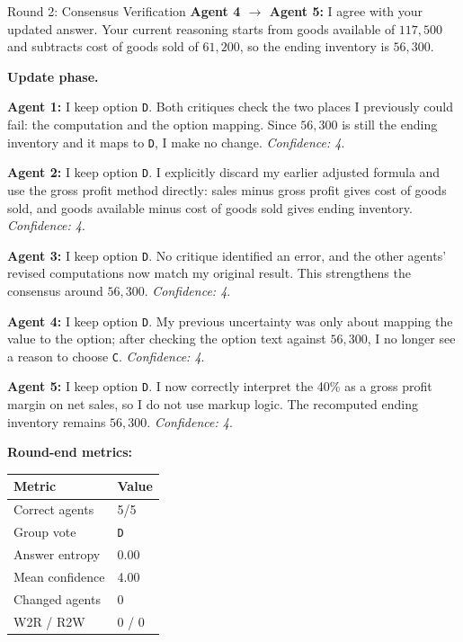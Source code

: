 \begin{roundbox}{Round 2: Consensus Verification}
\textbf{Agent 4 $\rightarrow$ Agent 5:} I agree with your updated answer. Your current reasoning starts from goods available of $117{,}500$ and subtracts cost of goods sold of $61{,}200$, so the ending inventory is $56{,}300$.

\textbf{Update phase.}

\textbf{Agent 1:} I keep option \texttt{D}. Both critiques check the two places I previously could fail: the computation and the option mapping. Since $56{,}300$ is still the ending inventory and it maps to \texttt{D}, I make no change. \textit{Confidence: 4}.

\textbf{Agent 2:} I keep option \texttt{D}. I explicitly discard my earlier adjusted formula and use the gross profit method directly: sales minus gross profit gives cost of goods sold, and goods available minus cost of goods sold gives ending inventory. \textit{Confidence: 4}.

\textbf{Agent 3:} I keep option \texttt{D}. No critique identified an error, and the other agents' revised computations now match my original result. This strengthens the consensus around $56{,}300$. \textit{Confidence: 4}.

\textbf{Agent 4:} I keep option \texttt{D}. My previous uncertainty was only about mapping the value to the option; after checking the option text against $56{,}300$, I no longer see a reason to choose \texttt{C}. \textit{Confidence: 4}.

\textbf{Agent 5:} I keep option \texttt{D}. I now correctly interpret the 40\% as a gross profit margin on net sales, so I do not use markup logic. The recomputed ending inventory remains $56{,}300$. \textit{Confidence: 4}.

\vspace{1mm}
\textbf{Round-end metrics:}
\begin{center}
\footnotesize
\begin{tabular}{@{}ll@{}}
\toprule
Metric & Value \\
\midrule
Correct agents & 5/5 \\
Group vote & \texttt{D} \\
Answer entropy & 0.00 \\
Mean confidence & 4.00 \\
Changed agents & 0 \\
W2R / R2W & 0 / 0 \\
\bottomrule
\end{tabular}
\end{center}


\end{roundbox}
